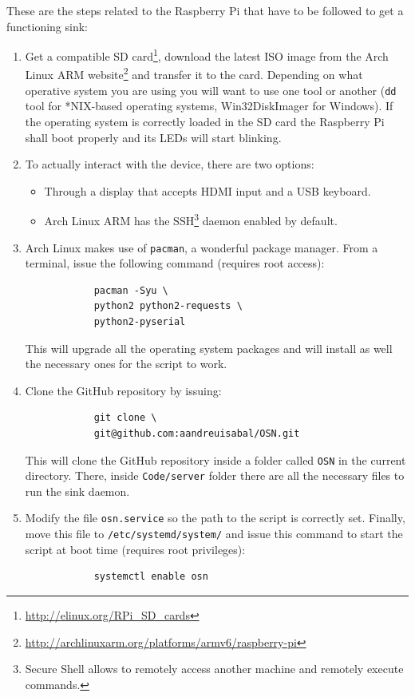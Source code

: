 These are the steps related to the Raspberry Pi that have to be followed to get a functioning sink:

\begin{enumerate}
    \item Get a compatible SD card\footnote{\url{http://elinux.org/RPi_SD_cards}}, download the latest ISO image from the Arch Linux ARM website\footnote{\url{http://archlinuxarm.org/platforms/armv6/raspberry-pi}} and transfer it to the card. Depending on what operative system you are using you will want to use one tool or another (\texttt{dd} tool for *NIX-based operating systems, Win32DiskImager for Windows). If the operating system is correctly loaded in the SD card the Raspberry Pi shall boot properly and its LEDs will start blinking.
    \item To actually interact with the device, there are two options:
        \begin{itemize}
            \item Through a display that accepts HDMI input and a USB keyboard.
            \item Arch Linux ARM has the SSH\footnote{Secure Shell allows to remotely access another machine and remotely execute commands.} daemon enabled by default.
        \end{itemize}
    \item Arch Linux makes use of \texttt{pacman}, a wonderful package manager. From a terminal, issue the following command (requires root access): 
        \begin{verbatim}
            pacman -Syu \
            python2 python2-requests \
            python2-pyserial
        \end{verbatim}
    This will upgrade all the operating system packages and will install as well the necessary ones for the script to work.
    \item Clone the GitHub repository by issuing: 
        \begin{verbatim}
            git clone \
            git@github.com:aandreuisabal/OSN.git
        \end{verbatim} 
        This will clone the GitHub repository inside a folder called \texttt{OSN} in the current directory. There, inside \texttt{Code/server} folder there are all the necessary files to run the sink daemon.
    \item Modify the file \texttt{osn.service} so the path to the script is correctly set. Finally, move this file to \texttt{/etc/systemd/system/} and issue this command to start the script at boot time (requires root privileges):
        \begin{verbatim}
            systemctl enable osn
        \end{verbatim}
\end{enumerate}



